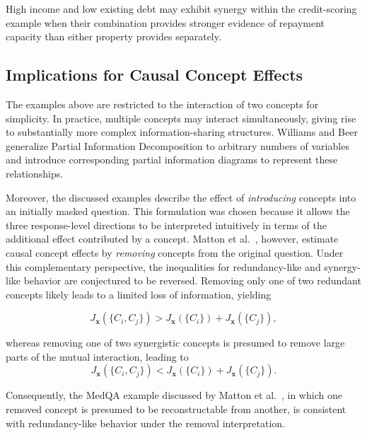 High income and low existing debt may exhibit synergy within the credit-scoring example when their combination provides stronger evidence of repayment capacity than either property provides separately.

\subsection{Implications for Causal Concept Effects}
The examples above are restricted to the interaction of two concepts for simplicity. In practice, multiple concepts may interact simultaneously, giving rise to substantially more complex information-sharing structures. Williams and Beer \cite{williamsNonnegativeDecompositionMultivariate2010} generalize Partial Information Decomposition to arbitrary numbers of variables and introduce corresponding partial information diagrams to represent these relationships.

Moreover, the discussed examples describe the effect of \emph{introducing} concepts into an initially masked question. This formulation was chosen because it allows the three response-level directions to be interpreted intuitively in terms of the additional effect contributed by a concept. Matton et al.~\cite{mattonWalkTalkMeasuring2024}, however, estimate causal concept effects by \emph{removing} concepts from the original question. Under this complementary perspective, the inequalities for redundancy-like and synergy-like behavior are conjectured to be reversed. Removing only one of two redundant concepts likely leads to a limited loss of information, yielding

\begin{equation}
	J_{\mathbf{x}}(\{C_i,C_j\})
	>
	J_{\mathbf{x}}(\{C_i\})+J_{\mathbf{x}}(\{C_j\}),
\end{equation}

whereas removing one of two synergistic concepts is presumed to remove large parts of the mutual interaction, leading to
\begin{equation}
	J_{\mathbf{x}}(\{C_i,C_j\})
	<
	J_{\mathbf{x}}(\{C_i\})+J_{\mathbf{x}}(\{C_j\}).
\end{equation}

Consequently, the MedQA example discussed by Matton et al.~\cite{mattonWalkTalkMeasuring2024}, in which one removed concept is presumed to be reconstructable from another, is consistent with redundancy-like behavior under the removal interpretation.

